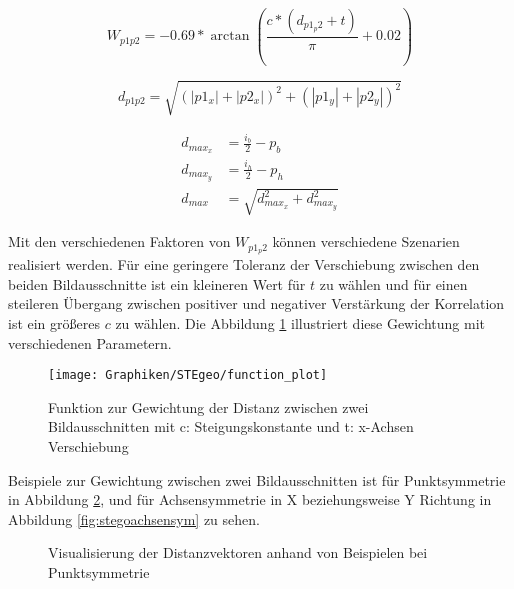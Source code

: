		\begin{equation}
			W_{p1p2} = -0.69 * \arctan(\frac{c*(d_{p1_p2} + t)}{\pi}+ 0.02) 
			\label{eq:STEgeo_w}
		\end{equation}
	
		\begin{equation}
			d_{p1p2} = \sqrt{(|p1_x|+|p2_x|)^2+(|p1_y|+|p2_y|)^2}
			\label{eq:dist_p1_p2}
		\end{equation}
	
		\begin{equation}
			\begin{aligned}
				d_{max_x} &= \frac{i_b}{2} - p_b	\\	
				d_{max_y} &= \frac{i_h}{2} - p_h\\
				d_{max} &= \sqrt{d_{max_x}^{2} + d_{max_y}^{2}}
			\end{aligned}
			\label{eq:STEgeo_maxAbs}
		\end{equation}	
		
		Mit den verschiedenen Faktoren von $W_{p1_p2}$ können verschiedene Szenarien realisiert werden. Für eine geringere Toleranz der Verschiebung zwischen den beiden Bildausschnitte ist ein kleineren Wert für $t$ zu wählen und für einen steileren Übergang zwischen positiver und negativer Verstärkung der Korrelation ist ein größeres $c$ zu wählen. Die Abbildung \ref{fig:STEgeo_func_plot_dist} illustriert diese Gewichtung mit verschiedenen Parametern. \\ 		
		
		\begin{figure}[h!]
			\centering
			\texttt{[image: Graphiken/STEgeo/function\_plot]}
			\caption{Funktion zur Gewichtung der Distanz zwischen zwei Bildausschnitten mit c: Steigungskonstante und t: x-Achsen Verschiebung}
			\label{fig:STEgeo_func_plot_dist}	
		\end{figure}
	
		Beispiele zur Gewichtung zwischen zwei Bildausschnitten ist für Punktsymmetrie in Abbildung \ref{fig:stegopunktsym}, und für Achsensymmetrie in X beziehungsweise Y Richtung in Abbildung \ref{fig:stegoachsensym} zu sehen.
		 
		\begin{figure}[h!]
			\centering
			\qquad
			\caption{Visualisierung der Distanzvektoren anhand von Beispielen bei Punktsymmetrie}
			\label{fig:stegopunktsym}
		\end{figure}
	
